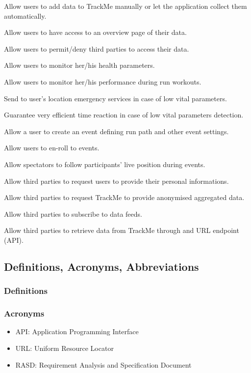 \documentclass{article}
\begin{document}
\begin{enumerate}[label={\textbf{[G\arabic*]}}]
\item Allow users to add data to TrackMe manually or let the application collect them automatically.
\item Allow users to have access to an overview page of their data.
\item Allow users to permit/deny third parties to access their data.
\item Allow users to monitor her/his health parameters.
\item Allow users to monitor her/his performance during run workouts.
\item Send to user’s location emergency services in case of low vital parameters. 
\item Guarantee very efficient time reaction in case of low vital parameters detection.
\item Allow a user to create an event defining run path and other event settings.
\item Allow users to en-roll to events.
\item Allow spectators to follow participants’ live position during events.


\item Allow third parties to request users to provide their personal informations.
\item Allow third parties to request TrackMe to provide anonymised aggregated data.
\item Allow third parties to subscribe to data feeds.
\item Allow third parties to retrieve data from TrackMe through and URL endpoint (API). 
\end{enumerate}


\subsection{Definitions, Acronyms, Abbreviations}
\subsubsection{Definitions}
\subsubsection{Acronyms}
\begin{itemize}
\item API: Application Programming Interface
\item URL: Uniform Resource Locator
\item RASD:  Requirement Analysis and Specification Document 
\end{itemize}
\end{document}
